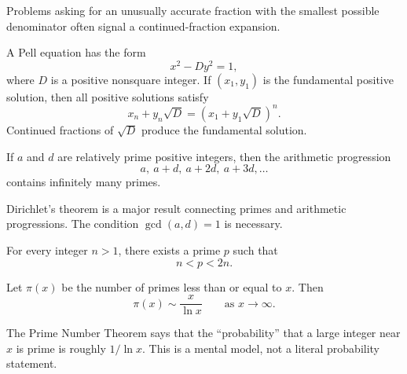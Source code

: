     \begin{strategy}
        Problems asking for an unusually accurate fraction with the smallest
        possible denominator often signal a continued-fraction expansion.
    \end{strategy}

    \begin{definition}
        A Pell equation has the form
        \[
            x^2-Dy^2=1,
        \]
        where $D$ is a positive nonsquare integer. If $(x_1,y_1)$ is the
        fundamental positive solution, then all positive solutions satisfy
        \[
            x_n+y_n\sqrt{D}
            =
            (x_1+y_1\sqrt{D})^n.
        \]
        Continued fractions of $\sqrt{D}$ produce the fundamental solution.
    \end{definition}

    \begin{theorem}
        If $a$ and $d$ are relatively prime positive integers, then the
        arithmetic progression
        \[
            a,\ a+d,\ a+2d,\ a+3d,\dots
        \]
        contains infinitely many primes.
    \end{theorem}

    \begin{remark}
        Dirichlet's theorem is a major result connecting primes and arithmetic
        progressions. The condition $\gcd(a,d)=1$ is necessary.
    \end{remark}

    \begin{theorem}
        For every integer $n>1$, there exists a prime $p$ such that
        \[
            n<p<2n.
        \]
    \end{theorem}

    \begin{theorem}
        Let $\pi(x)$ be the number of primes less than or equal to $x$. Then
        \[
            \pi(x)\sim \frac{x}{\ln x}
            \qquad
            \text{as }x\to\infty.
        \]
    \end{theorem}

    \begin{idea}
        The Prime Number Theorem says that the ``probability'' that a large
        integer near $x$ is prime is roughly $1/\ln x$. This is a mental model,
        not a literal probability statement.
    \end{idea}

